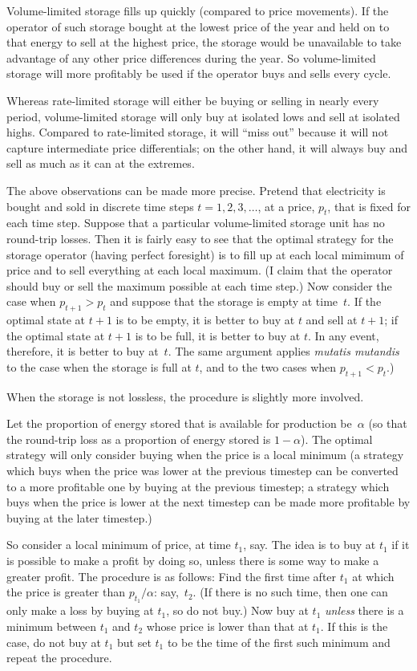 \documentclass[12pt, a4paper]{article}
\begin{document}
Volume-limited storage fills up quickly (compared to price
movements). If the operator of such storage bought at the lowest price
of the year and held on to that energy to sell at the highest price,
the storage would be unavailable to take advantage of any other price
differences during the year. So volume-limited storage will more
profitably be used if the operator buys and sells every cycle.

Whereas rate-limited storage will either be buying or selling in
nearly every period, volume-limited storage will only buy at isolated
lows and sell at isolated highs. Compared to rate-limited storage, it
will ``miss out'' because it will not capture intermediate price
differentials; on the other hand, it will always buy and sell as much
as it can at the extremes. 

The above observations can be made more precise. Pretend that
electricity is bought and sold in discrete time steps $t = 1, 2,
3,\dots$, at a price, $p_t$, that is fixed for each time step. Suppose
that a particular volume-limited storage unit has no round-trip
losses. Then it is fairly easy to see that the optimal strategy for
the storage operator (having perfect foresight) is to fill up at each
local mimimum of price and to sell everything at each local
maximum. (I claim that the operator should buy or sell the maximum
possible at each time step.) Now consider the case when $p_{t+1} > p_t$
and suppose that the storage is empty at time~$t$. If the optimal
state at $t+1$ is to be empty, it is better to buy at $t$ and sell at
$t+1$; if the optimal state at $t+1$ is to be full, it is better to
buy at $t$. In any event, therefore, it is better to buy at~$t$. The
same argument applies \emph{mutatis mutandis} to the case when the
storage is full at $t$, and to the two cases when $p_{t+1} < p_t$.)

When the storage is not lossless, the procedure is slightly more
involved.

Let the proportion of energy stored that is available for production
be~$\alpha$ (so that the round-trip loss as a proportion of energy
stored is $1-\alpha$). The optimal strategy will only consider buying
when the price is a local minimum (a strategy which buys when the
price was lower at the previous timestep can be converted to a more
profitable one by buying at the previous timestep; a strategy which
buys when the price is lower at the next timestep can be made more
profitable by buying at the later timestep.)

So consider a local minimum of price, at time $t_1$, say. The idea is
to buy at $t_1$ if it is possible to make a profit by doing so, unless
there is some way to make a greater profit. The procedure is as
follows: Find the first time after $t_1$ at which the price is greater
than $p_{t_1}/\alpha$: say,~$t_2$. (If there is no such time, then one
can only make a loss by buying at $t_1$, so do not buy.) Now buy at
$t_1$ \emph{unless} there is a minimum between $t_1$ and $t_2$ whose
price is lower than that at $t_1$. If this is the case, do not buy at
$t_1$ but set $t_1$ to be the time of the first such minimum and
repeat the procedure.
\end{document}
